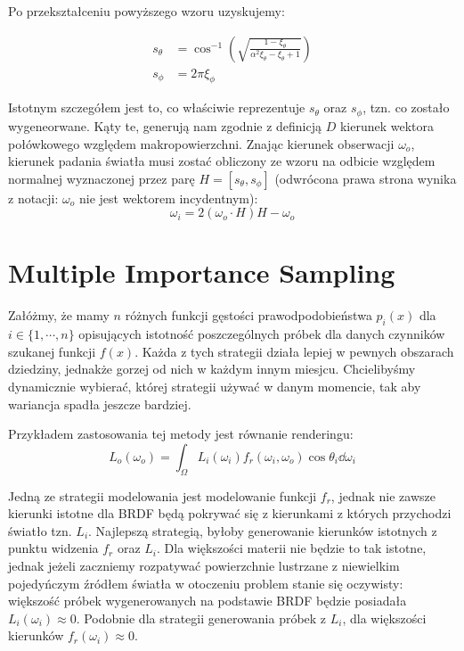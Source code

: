 \documentclass[../main.tex]{subfiles}
\begin{document}
Po przekształceniu powyższego wzoru uzyskujemy:

\begin{align*}
  s_\theta &= \cos^{-1}\left(
    \sqrt{
      \frac{1 - \xi_\theta}{\alpha^2 \xi_\theta - \xi_\theta + 1}
    }
  \right) \\
  s_{\phi} &= 2 \pi \xi_{\phi}
\end{align*}

Istotnym szczegółem jest to, co właściwie reprezentuje $s_\theta$ oraz $s_\phi$, tzn. co zostało wygeneorwane. Kąty te, generują nam zgodnie z definicją $D$ kierunek wektora połówkowego względem makropowierzchni. Znając kierunek obserwacji $\omega_o$, kierunek padania światła musi zostać obliczony ze wzoru na odbicie względem normalnej wyznaczonej przez parę $H = [s_\theta, s_\phi]$ (odwrócona prawa strona wynika z notacji: $\omega_o$ nie jest wektorem incydentnym):
\[
	\omega_i = 2(\omega_o \cdot H)H - \omega_o
\]

\section{Multiple Importance Sampling}
\label{Chapter:MIS}

Załóżmy, że mamy $n$ różnych funkcji gęstości prawodpodobieństwa $p_{i}(x)$ dla
$i \in \{ 1, \cdots, n \}$ opisujących istotność poszczególnych próbek dla
danych czynników szukanej funkcji $f(x)$. Każda z tych strategii działa lepiej
w pewnych obszarach dziedziny, jednakże gorzej od nich w każdym innym miesjcu.
Chcielibyśmy dynamicznie wybierać, której strategii używać w danym momencie,
tak aby wariancja spadła jeszcze bardziej.

Przykładem zastosowania tej metody jest równanie renderingu:
\[
L_o(\omega_o) = \int_{\Omega} {
	L_i(\omega_{i})
	f_r(\omega_{i}, \omega_{o})
	\cos \theta_{i}
	\dd\omega_{i}
}
\]

Jedną ze strategii modelowania jest modelowanie funkcji $f_r$, jednak nie zawsze kierunki istotne dla BRDF będą pokrywać się z kierunkami z których przychodzi światło tzn. $L_i$. Najlepszą strategią, byłoby generowanie kierunków istotnych z punktu widzenia $f_r$ oraz $L_i$. Dla większości materii nie będzie to tak istotne, jednak jeżeli zaczniemy rozpatywać powierzchnie lustrzane z niewielkim pojedyńczym źródłem światła w otoczeniu problem stanie się oczywisty: większość próbek wygenerowanych na podstawie BRDF będzie posiadała $L_i(\omega_i) \approx 0$. Podobnie dla strategii generowania próbek z $L_i$, dla większości kierunków $f_r(\omega_i) \approx 0$.
\end{document}
